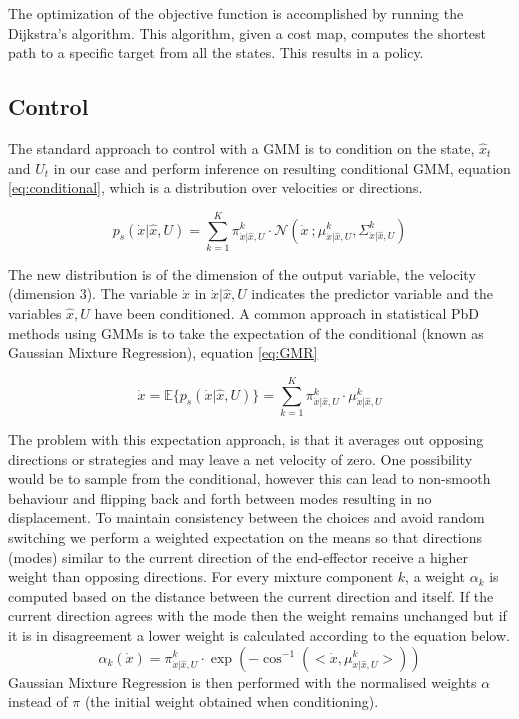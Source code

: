 The optimization of the objective function is accomplished by running the Dijkstra's algorithm. This algorithm, given a cost map, 
computes the shortest path to a specific target from all the states. This results in a policy.

\subsection{Control}
The standard approach to control with a GMM is to condition on the state,
$\hat{x}_t$ and $U_t$ in our case and perform inference on resulting conditional
GMM, equation \ref{eq:conditional}, which is a distribution over velocities or directions.

\begin{equation} \label{eq:conditional}
  p_s(\dot{x}|\hat{x},U) = \sum\limits_{k=1}^{K} \pi^{k}_{\dot{x}|\hat{x},U} \cdot  \mathcal{N}\left(\dot{x}\: ;  \mu^{k}_{\dot{x}|\hat{x},U}, \Sigma^{k}_{\dot{x}|\hat{x},U} \right)
\end{equation}

The new distribution is of the dimension of the output variable, the velocity (dimension 3). 
The variable $\dot{x}$ in $\dot{x}|\hat{x},U$ indicates the predictor variable and the variables $\hat{x},U$ have been conditioned.
A common approach in statistical PbD methods using GMMs is to take the expectation of the conditional (known as Gaussian Mixture Regression), equation \ref{eq:GMR}

\begin{equation} \label{eq:GMR}
 \dot{x} = \mathbb{E}\{p_s(\dot{x}|\hat{x},U)\} = \sum\limits_{k=1}^{K}  \pi^{k}_{\dot{x}|\hat{x},U} \cdot \mu^{k}_{\dot{x}|\hat{x},U}
\end{equation}

The problem with this expectation approach, is that it averages out opposing directions or strategies and may leave 
a net velocity of zero. One possibility would be to sample from the conditional, however this can lead to non-smooth 
behaviour and flipping back and forth between modes resulting in no displacement. To maintain consistency between the
choices and avoid random switching  we perform a weighted expectation on the means so that 
directions (modes) similar to the current direction of the end-effector receive
a higher weight than opposing directions. For every mixture component $k$, a weight $\alpha_k$ is computed based 
on the distance between the current direction and itself.
If the current direction agrees with the mode then the weight remains unchanged but if it is in
disagreement a lower weight is
calculated according to the equation below. 
\begin{equation}  \label{eq:weight}
  \alpha_{k}(\dot{x}) = \pi^{k}_{\dot{x}|\hat{x},U} \cdot \exp(-\cos^{-1}(<\dot{x},\mu^{k}_{\dot{x}|\hat{x},U}>))
\end{equation}
Gaussian Mixture Regression is then performed with the normalised  weights $\alpha$ instead of $\pi$
(the initial weight obtained when conditioning).

